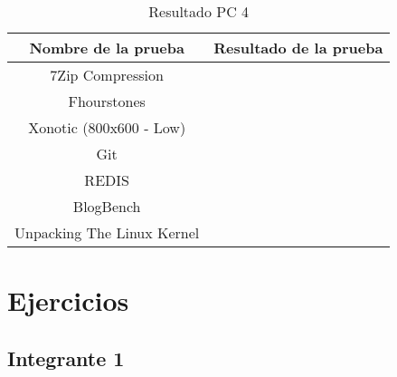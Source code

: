 \documentclass[12pt]{article}
\begin{document}
\begin{table}[!htb]
    \centering
    \begin{tabular}{|c|c|}
        \hline
        \textbf{Nombre de la prueba} & \textbf{Resultado de la prueba}\\
        \hline
        7Zip Compression &  \\
        \hline
        Fhourstones &  \\
        \hline
        Xonotic (800x600 - Low) &  \\
        \hline
        Git &  \\
        \hline
        REDIS &  \\
        \hline
        BlogBench &  \\
        \hline
        Unpacking The Linux Kernel &  \\
        \hline
    \end{tabular}
    \caption{Resultado PC 4}
\end{table}

\newpage
\section{Ejercicios}
\subsection{Integrante 1}
\end{document}
